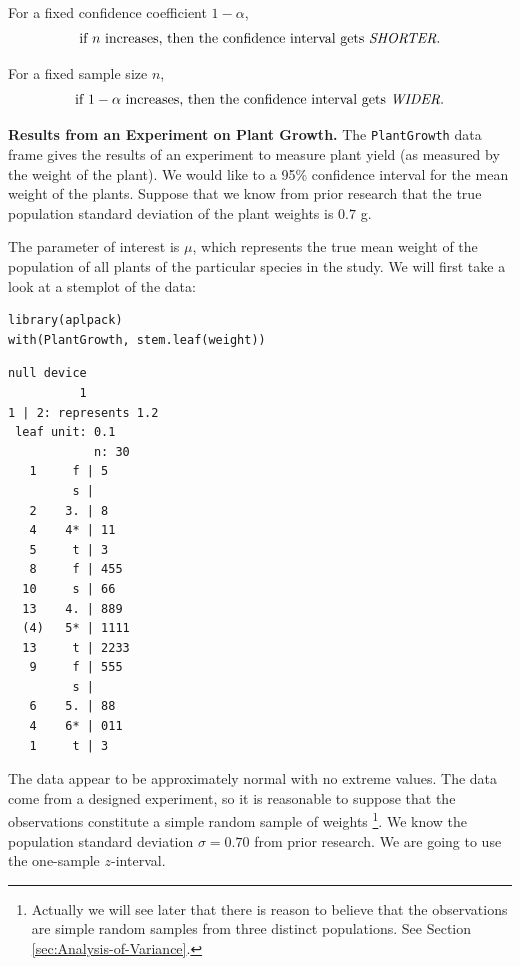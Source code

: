 \documentclass[captions=tableheading]{scrbook}
\begin{document}
\begin{rem}
For a fixed confidence coefficient \(1-\alpha\),
\begin{equation}
\mbox{if }n\mbox{ increases, then the confidence interval gets \emph{SHORTER}.}
\end{equation}
\end{rem}

\begin{rem}
For a fixed sample size \(n\),
\begin{equation}
\mbox{if }1-\alpha\mbox{ increases, then the confidence interval gets \emph{WIDER}.}
\end{equation}
\end{rem}


\begin{example}
\label{exa:plant-one-samp-z-int}
\textbf{Results from an Experiment on Plant Growth.} The \texttt{PlantGrowth} data frame gives the results of an experiment to measure plant yield (as measured by the weight of the plant). We would like to a 95\% confidence interval for the mean weight of the plants. Suppose that we know from prior research that the true population standard deviation of the plant weights is \(0.7\) g.

The parameter of interest is \(\mu\), which represents the true mean weight of the population of all plants of the particular species in the study. We will first take a look at a stemplot of the data:

\end{example}


\begin{verbatim}
library(aplpack)
with(PlantGrowth, stem.leaf(weight))
\end{verbatim}


\begin{verbatim}
null device 
          1
1 | 2: represents 1.2
 leaf unit: 0.1
            n: 30
   1     f | 5
         s | 
   2    3. | 8
   4    4* | 11
   5     t | 3
   8     f | 455
  10     s | 66
  13    4. | 889
  (4)   5* | 1111
  13     t | 2233
   9     f | 555
         s | 
   6    5. | 88
   4    6* | 011
   1     t | 3
\end{verbatim}

The data appear to be approximately normal with no extreme values. The data come from a designed experiment, so it is reasonable to suppose that the observations constitute a simple random sample of weights
\footnote{Actually we will see later that there is reason to believe that the observations are simple random samples from three distinct populations. See Section \ref{sec:Analysis-of-Variance}.}. 
We know the population standard deviation \(\sigma=0.70\) from prior research. We are going to use the one-sample \(z\)-interval.
\end{document}

